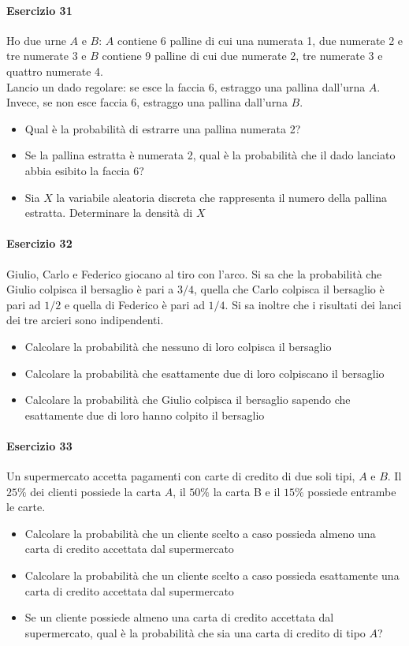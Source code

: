 \documentclass[12pt]{article}
\begin{document}
    \paragraph{Esercizio 31}
    Ho due urne $A$ e $B$: $A$ contiene 6 palline di cui una numerata 1, due numerate 2 e tre numerate 3 e $B$ contiene 9 palline di cui due numerate 2, tre numerate 3 e quattro numerate 4.
    \\Lancio un dado regolare: se esce la faccia 6, estraggo una pallina dall’urna $A$. Invece, se non esce faccia 6, estraggo una pallina dall’urna $B$.
    \begin{itemize}
        \item Qual è la probabilità di estrarre una pallina numerata 2?
        \item Se la pallina estratta è numerata 2, qual è la probabilità che il dado lanciato abbia esibito la faccia 6?
        \item Sia $X$ la variabile aleatoria discreta che rappresenta il numero della pallina estratta. Determinare la densità di $X$
    \end{itemize}
    \paragraph{Esercizio 32}
    Giulio, Carlo e Federico giocano al tiro con l’arco. Si sa che la probabilità che Giulio colpisca il bersaglio è pari a $3/4$, quella che Carlo colpisca il bersaglio è pari ad $1/2$ e quella di Federico è pari ad $1/4$. Si sa inoltre che i risultati dei lanci dei tre arcieri sono indipendenti.
    \begin{itemize}
        \item Calcolare la probabilità che nessuno di loro colpisca il bersaglio
        \item Calcolare la probabilità che esattamente due di loro colpiscano il bersaglio
        \item Calcolare la probabilità che Giulio colpisca il bersaglio sapendo che esattamente due di loro hanno colpito il bersaglio
    \end{itemize}
    \paragraph{Esercizio 33}
    Un supermercato accetta pagamenti con carte di credito di due soli tipi, $A$ e $B$. Il $25\%$ dei clienti possiede la carta $A$, il $50\%$ la carta B e il $15\%$ possiede entrambe le carte.
    \begin{itemize}
        \item Calcolare la probabilità che un cliente scelto a caso possieda almeno una carta di credito accettata dal supermercato
        \item Calcolare la probabilità che un cliente scelto a caso possieda esattamente una carta di credito accettata dal supermercato
        \item Se un cliente possiede almeno una carta di credito accettata dal supermercato, qual è la probabilità che sia una carta di credito di tipo $A$?
    \end{itemize}
    \newpage
\end{document}
